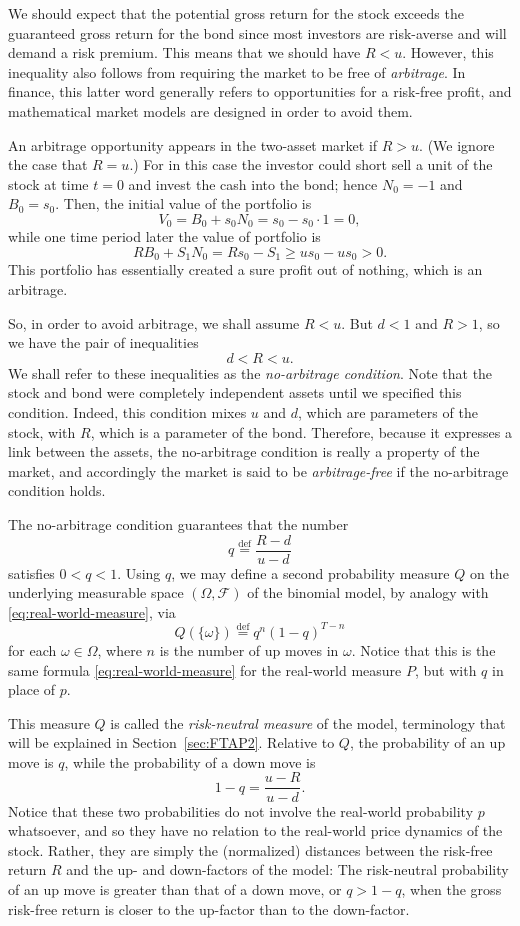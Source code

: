 \documentclass[11pt, openany, oneside]{book}
\theoremstyle{definition}
\theoremstyle{remark}
\theoremstyle{boldital}
\numberwithin{equation}{section}
\begin{document}
We should expect that the potential gross return for the stock exceeds the guaranteed gross return for the bond since most investors are risk-averse and will demand a risk premium. This means that we should have $R < u$. However, this inequality also follows from requiring the market to be free of \textit{arbitrage}. In finance, this latter word generally refers to opportunities for a risk-free profit, and mathematical market models are designed in order to avoid them.

An arbitrage opportunity appears in the two-asset market if $R > u$. (We ignore the case that $R=u$.) For in this case the investor could short sell a unit of the stock at time $t=0$ and invest the cash into the bond; hence $N_0=-1$ and $B_0 = s_0$. Then, the initial value of the portfolio is
	\[
	V_0 = B_0 + s_0N_0 = s_0 - s_0 \cdot 1 =0,
	\]
while one time period later the value of portfolio is
	\[
	RB_0 + S_1N_0 = Rs_0 -S_1 \geq us_0 -us_0 > 0.
	\]
This portfolio has essentially created a sure profit out of nothing, which is an arbitrage.

So, in order to avoid arbitrage, we shall assume $R < u$. But $d<1$ and $R>1$, so we have the pair of inequalities
	\[
	d < R < u.
	\]
We shall refer to these inequalities as the \textit{no-arbitrage condition}. Note that the stock and bond were completely independent assets until we specified this condition. Indeed, this condition mixes $u$ and $d$, which are parameters of the stock, with $R$, which is a parameter of the bond. Therefore, because it expresses a link between the assets, the no-arbitrage condition is really a property of the market, and accordingly the market is said to be \textit{arbitrage-free} if the no-arbitrage condition holds.

The no-arbitrage condition guarantees that the number
	\[
	q \stackrel{\text{def}}{=} \frac{R-d}{u-d}
	\]
satisfies $0 < q < 1$. Using $q$, we may define a second probability measure $Q$ on the underlying measurable space $(\Omega, \mathcal{F})$ of the binomial model, by analogy with \eqref{eq:real-world-measure}, via
	\[
	Q(\{\omega\}) \stackrel{\text{def}}{=} q^n (1-q)^{T-n}
	\]
for each $\omega \in \Omega$, where $n$ is the number of up moves in $\omega$. Notice that this is the same formula \eqref{eq:real-world-measure} for the real-world measure $P$, but with $q$ in place of $p$.

This measure $Q$ is called the \textit{risk-neutral measure} of the model, terminology that will be explained in Section~\ref{sec:FTAP2}. Relative to $Q$, the probability of an up move is $q$, while the probability of a down move is
	\[
	1-q = \frac{u-R}{u-d}.
	\]
Notice that these two probabilities do not involve the real-world probability $p$ whatsoever, and so they have no relation to the real-world price dynamics of the stock. Rather, they are simply the (normalized) distances between the risk-free return $R$ and the up- and down-factors of the model: The risk-neutral probability of an up move is greater than that of a down move, or $q> 1-q$, when the gross risk-free return is closer to the up-factor than to the down-factor.
\end{document}
